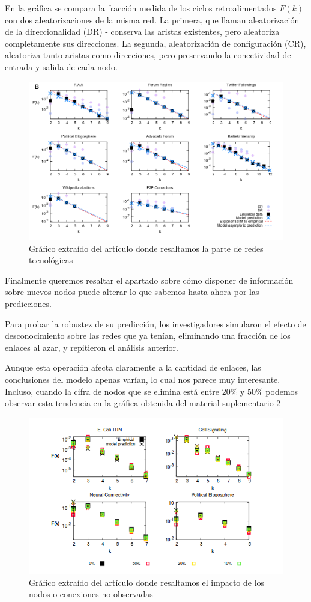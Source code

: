 \documentclass[1p]{elsarticle}
\begin{document}
 En la gráfica se compara la fracción medida de los ciclos retroalimentados $F(k)$ con dos aleatorizaciones de la misma red. La primera, que llaman aleatorización de la direccionalidad (DR) - conserva las aristas existentes, pero aleatoriza completamente sus direcciones. La segunda, aleatorización de configuración (CR), aleatoriza tanto aristas como direcciones, pero preservando la conectividad de entrada y salida de cada nodo.
\begin{figure}
	\centering
	\includegraphics[width=15cm]{graf_2.png}
	\caption{Gráfico extraído del artículo donde resaltamos la parte de redes tecnológicas}
	\label{h1}
\end{figure}

Finalmente queremos resaltar el apartado sobre cómo disponer de información sobre nuevos nodos puede alterar lo que sabemos hasta ahora por las predicciones.

 Para probar la robustez
de su predicción, los investigadores simularon el efecto de desconocimiento sobre las redes que ya tenían,
eliminando una fracción de los enlaces al azar, y repitieron el análisis anterior. 

Aunque esta operación afecta claramente a la cantidad de enlaces, las conclusiones del modelo apenas varían, lo cual nos parece muy interesante. Incluso, cuando la cifra de nodos que se elimina está entre $20\%$ y $50\%$ podemos observar esta tendencia en la gráfica obtenida del material suplementario \ref{h4}
\begin{figure}
	\centering
	\includegraphics[width=15cm]{graf_3.png}
	\caption{Gráfico extraído del artículo donde resaltamos el impacto de los nodos o conexiones no observadas}
	\label{h4}
\end{figure}
\end{document}
